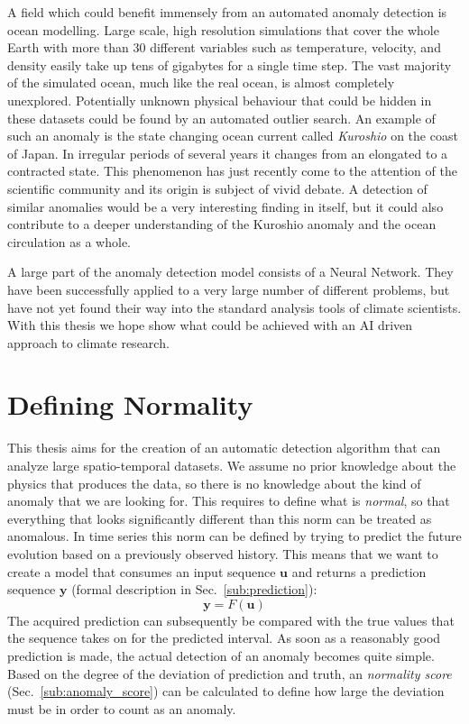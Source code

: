 A field which could benefit immensely from an automated anomaly detection is
ocean modelling.  Large scale, high resolution simulations that cover the whole
Earth with more than 30 different variables such as temperature, velocity, and
density easily take up tens of gigabytes for a single time step. The vast
majority of the simulated ocean, much like the real ocean, is almost completely
unexplored.  Potentially unknown physical behaviour that could be hidden in
these datasets could be found by an automated outlier search. An example of
such an anomaly is the state changing ocean current called \emph{Kuroshio} on
the coast of Japan.  In irregular periods of several years it changes from an
elongated to a contracted state. This phenomenon has just recently come to the
attention of the scientific community and its origin is subject of vivid
debate. A detection of similar anomalies would be a very interesting finding in
itself, but it could also contribute to a deeper understanding of the Kuroshio
anomaly and the ocean circulation as a whole.

A large part of the anomaly detection model consists of a Neural Network. They
have been successfully applied to a very large number of different problems,
but have not yet found their way into the standard analysis tools of climate
scientists. With this thesis we hope show what could be achieved with an AI
driven approach to climate research.



\section{Defining Normality}%
\label{sec:defining_what_is_normal}

This thesis aims for the creation of an automatic detection algorithm that can
analyze large spatio-temporal datasets. We assume no prior knowledge about the
physics that produces the data, so there is no knowledge about the kind of
anomaly that we are looking for.  This requires to define what is
{\em normal}, so that everything that looks significantly different than this
norm can be treated as anomalous.  In time series this norm can be defined by
trying to predict the future evolution based on a previously observed history.
This means that we want to create a model that consumes an input sequence
$\mathbf{u}$ and returns a prediction sequence $\mathbf{y}$ (formal description
in Sec.~\ref{sub:prediction}):
\begin{equation}
  \mathbf{y} = F(\mathbf{u})
\end{equation}
The acquired prediction can subsequently be compared with the true values that
the sequence takes on for the predicted interval.  As soon as a reasonably good
prediction is made, the actual detection of an anomaly becomes quite simple.
Based on the degree of the deviation of prediction and truth, an \emph{normality
score} (Sec.~\ref{sub:anomaly_score}) can be calculated to define how large the
deviation must be in order to count as an anomaly.


